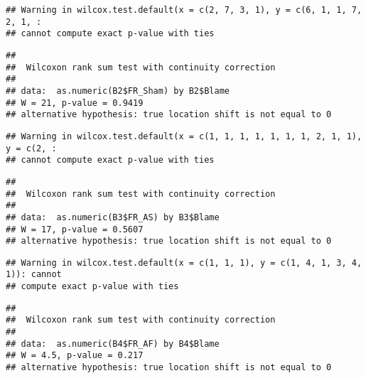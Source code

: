 \documentclass[
]{article}
\newenvironment{Shaded}{\begin{snugshade}}{\end{snugshade}}
\newcommand{\KeywordTok}[1]{\textcolor[rgb]{0.13,0.29,0.53}{\textbf{#1}}}
\newcommand{\NormalTok}[1]{#1}
\newcommand{\OperatorTok}[1]{\textcolor[rgb]{0.81,0.36,0.00}{\textbf{#1}}}
\newcommand{\StringTok}[1]{\textcolor[rgb]{0.31,0.60,0.02}{#1}}
\begin{document}
\begin{verbatim}
## Warning in wilcox.test.default(x = c(2, 7, 3, 1), y = c(6, 1, 1, 7, 2, 1, :
## cannot compute exact p-value with ties
\end{verbatim}

\begin{verbatim}
## 
##  Wilcoxon rank sum test with continuity correction
## 
## data:  as.numeric(B2$FR_Sham) by B2$Blame
## W = 21, p-value = 0.9419
## alternative hypothesis: true location shift is not equal to 0
\end{verbatim}

\begin{Shaded}
\end{Shaded}

\begin{verbatim}
## Warning in wilcox.test.default(x = c(1, 1, 1, 1, 1, 1, 1, 2, 1, 1), y = c(2, :
## cannot compute exact p-value with ties
\end{verbatim}

\begin{verbatim}
## 
##  Wilcoxon rank sum test with continuity correction
## 
## data:  as.numeric(B3$FR_AS) by B3$Blame
## W = 17, p-value = 0.5607
## alternative hypothesis: true location shift is not equal to 0
\end{verbatim}

\begin{Shaded}
\end{Shaded}

\begin{verbatim}
## Warning in wilcox.test.default(x = c(1, 1, 1), y = c(1, 4, 1, 3, 4, 1)): cannot
## compute exact p-value with ties
\end{verbatim}

\begin{verbatim}
## 
##  Wilcoxon rank sum test with continuity correction
## 
## data:  as.numeric(B4$FR_AF) by B4$Blame
## W = 4.5, p-value = 0.217
## alternative hypothesis: true location shift is not equal to 0
\end{verbatim}
\end{document}
